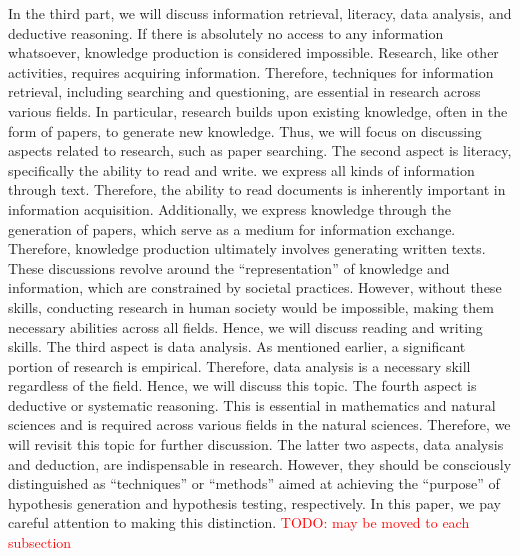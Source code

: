 \documentclass{book}
\begin{document}
In the third part, we will discuss information retrieval, literacy, data analysis, and deductive reasoning. If there is absolutely no access to any information whatsoever, knowledge production is considered impossible. Research, like other activities, requires acquiring information. Therefore, techniques for information retrieval, including searching and questioning, are essential in research across various fields. In particular, research builds upon existing knowledge, often in the form of papers, to generate new knowledge. Thus, we will focus on discussing aspects related to research, such as paper searching. The second aspect is literacy, specifically the ability to read and write. we express all kinds of information through text. Therefore, the ability to read documents is inherently important in information acquisition. Additionally, we express knowledge through the generation of papers, which serve as a medium for information exchange. Therefore, knowledge production ultimately involves generating written texts. These discussions revolve around the ``representation'' of knowledge and information, which are constrained by societal practices. However, without these skills, conducting research in human society would be impossible, making them necessary abilities across all fields. Hence, we will discuss reading and writing skills. The third aspect is data analysis. As mentioned earlier, a significant portion of research is empirical. Therefore, data analysis is a necessary skill regardless of the field. Hence, we will discuss this topic. The fourth aspect is deductive or systematic reasoning. This is essential in mathematics and natural sciences and is required across various fields in the natural sciences. Therefore, we will revisit this topic for further discussion. The latter two aspects, data analysis and deduction, are indispensable in research. However, they should be consciously distinguished as ``techniques'' or ``methods'' aimed at achieving the ``purpose'' of hypothesis generation and hypothesis testing, respectively. In this paper, we pay careful attention to making this distinction. \textcolor{red}{TODO: may be moved to each subsection}



\end{document}
